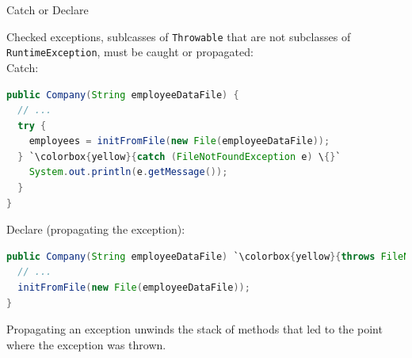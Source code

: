 \documentclass{beamer}
\begin{document}
\begin{frame}[fragile]{Catch or Declare}

\vspace{-.05in}
Checked exceptions, sublcasses of {\tt Throwable} that are not subclasses of {\tt RuntimeException}, must be caught or propagated:\\
\vspace{.05in}
Catch:
\vspace{-.05in}
\begin{lstlisting}[language=Java,escapechar=`]
public Company(String employeeDataFile) {
  // ...
  try {
    employees = initFromFile(new File(employeeDataFile));
  } `\colorbox{yellow}{catch (FileNotFoundException e) \{}`
    System.out.println(e.getMessage());
  }
}
\end{lstlisting}
\vspace{-.05in}
Declare (propagating the exception):
\vspace{-.05in}
\begin{lstlisting}[language=Java,escapechar=`]
public Company(String employeeDataFile) `\colorbox{yellow}{throws FileNotFoundException \{}`
  // ...
  initFromFile(new File(employeeDataFile));
}
\end{lstlisting}
\vspace{-.05in}
Propagating an exception unwinds the stack of methods that led to the point where the exception was thrown.
\end{frame}
\end{document}
